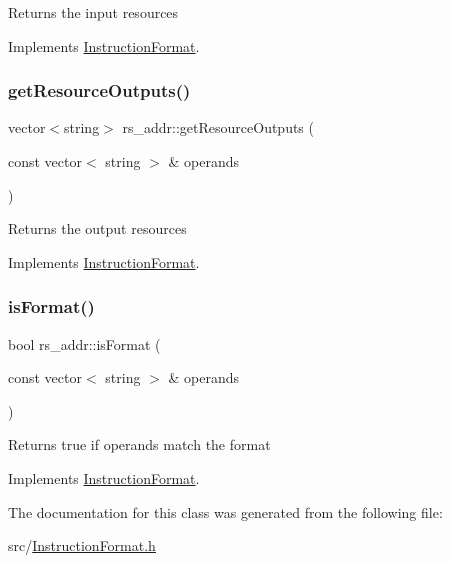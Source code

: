 Returns the input resources 

Implements \hyperlink{classInstructionFormat_a09775d3a3c22f40a0f44504664e586e4}{Instruction\+Format}.

\mbox{\label{classrs__addr_ae38e946613927e43fc9ec274386978f7}} 
\subsubsection{\texorpdfstring{get\+Resource\+Outputs()}{getResourceOutputs()}}
{\footnotesize\ttfamily vector$<$string$>$ rs\+\_\+addr\+::get\+Resource\+Outputs (\begin{DoxyParamCaption}\item[{const vector$<$ string $>$ \&}]{operands }\end{DoxyParamCaption})\hspace{0.3cm}{\ttfamily [virtual]}}

Returns the output resources 

Implements \hyperlink{classInstructionFormat_a95cd28ffb1bde59b67f676880ab10536}{Instruction\+Format}.

\mbox{\label{classrs__addr_a49101844a8143d3ad6be1fc1435bc719}} 
\subsubsection{\texorpdfstring{is\+Format()}{isFormat()}}
{\footnotesize\ttfamily bool rs\+\_\+addr\+::is\+Format (\begin{DoxyParamCaption}\item[{const vector$<$ string $>$ \&}]{operands }\end{DoxyParamCaption})\hspace{0.3cm}{\ttfamily [virtual]}}

Returns true if operands match the format 

Implements \hyperlink{classInstructionFormat_a9fdcf94dcd7d9a55ba86e7a63f04d1fe}{Instruction\+Format}.



The documentation for this class was generated from the following file\+:\begin{DoxyCompactItemize}
\item 
src/\hyperlink{InstructionFormat_8h}{Instruction\+Format.\+h}\end{DoxyCompactItemize}
